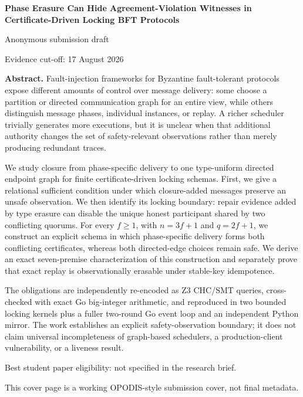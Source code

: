 \documentclass[10pt,a4paper]{article}
\begin{document}
\begin{titlepage}
\centering
\vspace*{22mm}
{\LARGE\bfseries Phase Erasure Can Hide Agreement-Violation Witnesses in
Certificate-Driven Locking BFT Protocols\par}
\vspace{14mm}
{\large Anonymous submission draft\par}
\vspace{8mm}
{\small Evidence cut-off: 17 August 2026\par}
\vfill
\begin{minipage}{0.88\textwidth}
\textbf{Abstract.}
Fault-injection frameworks for Byzantine fault-tolerant protocols expose
different amounts of control over message delivery: some choose a
partition or directed communication graph for an entire view, while
others distinguish message phases, individual instances, or replay. A
richer scheduler trivially generates more executions, but it is unclear
when that additional authority changes the set of safety-relevant
observations rather than merely producing redundant traces.

We study closure from phase-specific delivery to one type-uniform
directed endpoint graph for finite certificate-driven locking schemas.
First, we give a relational sufficient condition under which
closure-added messages preserve an unsafe observation. We then identify
its locking boundary: repair evidence added by type erasure can disable
the unique honest participant shared by two conflicting quorums. For
every \(f\geq1\), with \(n=3f+1\) and \(q=2f+1\), we construct an
explicit schema in which phase-specific delivery forms both conflicting
certificates, whereas both directed-edge choices remain safe. We derive
an exact seven-premise characterization of this construction and
separately prove that exact replay is observationally erasable under
stable-key idempotence.

The obligations are independently re-encoded as Z3 CHC/SMT queries,
cross-checked with exact Go big-integer arithmetic, and reproduced in
two bounded locking kernels plus a fuller two-round Go event loop and an
independent Python mirror. The work establishes an explicit
safety-observation boundary; it does not claim universal incompleteness
of graph-based schedulers, a production-client vulnerability, or a
liveness result.
\end{minipage}
\vfill
{\small Best student paper eligibility: not specified in the research brief.\par}
{\small This cover page is a working OPODIS-style submission cover, not final metadata.\par}
\end{titlepage}
\end{document}
